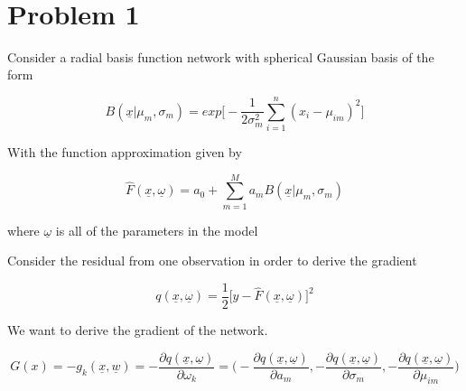 \documentclass[11pt]{article}
\begin{document}
\begin{center}

\ \\
\end{center}

\section*{Problem 1}

\vspace{5 mm}
\noindent
 Consider a radial basis function network with spherical Gaussian basis of the form
 
 $$B(\underline{x}|\mu_m, \sigma_m) = exp\bigg[-\frac{1}{2\sigma_m^2}\sum_{i = 1}^{n}(x_i-\mu_{im})^2\bigg]$$
 
 With the function approximation given by 
 
 $$\hat{F}(\underline{x},\underline{\omega}) = a_0 + \sum_{m=1}^{M}a_mB(\underline{x}|\mu_m, \sigma_m)$$
 
 \begin{center}
 where $\underline{\omega}$ is all of the parameters in the model
 \end{center}
 
 Consider the residual from one observation in order to derive the gradient
 
 $$q(\underline{x},\underline{\omega}) = \frac{1}{2} \bigg[ y - \hat{F}(\underline{x},\underline{\omega})\bigg]^2$$
 
 We want to derive the gradient of the network. 
 
 \begin{equation}
 G(x) = -g_k(\underline{x}, \underline{w}) = - \frac{\partial q(\underline{x}, \underline{\omega})}{\partial\omega_k} = \bigg(- \frac{\partial q(\underline{x}, \underline{\omega})}{\partial a_m}, - \frac{\partial q(\underline{x}, \underline{\omega})}{\partial \sigma_m}, - \frac{\partial q(\underline{x}, \underline{\omega})}{\partial \mu_{im}}\bigg)
 \end{equation}
 
\end{document}
